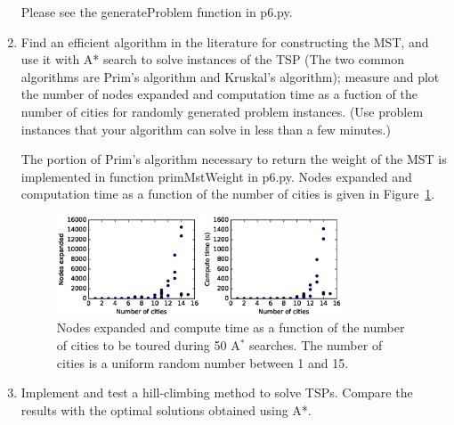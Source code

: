 \documentclass[12pt]{article}
\newenvironment{problem}[2][Problem]{\begin{trivlist}
\item[\hskip \labelsep {\bfseries #1}\hskip \labelsep {\bfseries #2.}]}{\end{trivlist}}
\begin{document}
\begin{problem}{6}
\begin{enumerate}
			Please see the generateProblem function in p6.py.
		\item
			Find an efficient algorithm in the literature for constructing the MST, and use it with A* search to solve instances of the TSP (The two common algorithms are Prim's algorithm and Kruskal's algorithm); measure and plot the number of nodes expanded and computation time as a fuction of the number of cities for randomly generated problem instances.
			(Use problem instances that your algorithm can solve in less than a few minutes.)

			The portion of Prim's algorithm necessary to return the weight of the MST is implemented in function primMstWeight in p6.py.
			Nodes expanded and computation time as a function of the number of cities is given in Figure~\ref{fig:p6graph}.
			\begin{figure}[h]
				\centering
				\includegraphics[width=0.8\textwidth]{fig/p6_h_0_cities_15_rand_True_iter_50_seed_0.eps}
				\caption{Nodes expanded and compute time as a function of the number of cities to be toured during 50 A$^*$ searches. The number of cities is a uniform random number between 1 and 15.}
				\label{fig:p6graph}
			\end{figure}
		\item[6.] Implement and test a hill-climbing method to solve TSPs. Compare the results with the optimal solutions obtained using A*.
			

\end{enumerate}
\end{problem}
\end{document}
